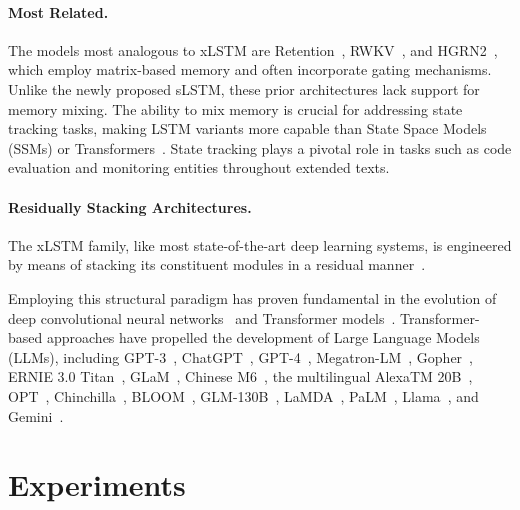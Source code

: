 \paragraph{Most Related.} The models most analogous to xLSTM are Retention~\citep{Sun:23arxiv}, RWKV~\citep{Peng:23arxivshort,Peng:24arxivshort}, and HGRN2~\citep{Qin:24arxiv}, which employ matrix-based memory and often incorporate gating mechanisms. Unlike the newly proposed sLSTM, these prior architectures lack support for memory mixing. The ability to mix memory is crucial for addressing state tracking tasks, making LSTM variants more capable than State Space Models (SSMs) or Transformers~\citep{Merrill:24,Deletang:23}. State tracking plays a pivotal role in tasks such as code evaluation and monitoring entities throughout extended texts.

\paragraph{Residually Stacking Architectures.} The xLSTM family, like most state-of-the-art deep learning systems, is engineered by means of stacking its constituent modules in a residual manner~\citep{Srivastava:15,He:16}.

Employing this structural paradigm has proven fundamental in the evolution of deep convolutional neural networks~\citep{He:16} and Transformer models~\citep{Vaswani:17}. Transformer-based approaches have propelled the development of Large Language Models (LLMs), including GPT-3~\citep{Brown:20short}, ChatGPT~\citep{Schulman:22short}, GPT-4~\citep{Achiam:23gpt4short}, Megatron-LM~\citep{Shoeybi:19}, Gopher~\citep{Rae:21short}, ERNIE 3.0 Titan~\citep{Wang:21arxivshort}, GLaM~\citep{Du:21glamshort}, Chinese M6~\citep{Lin:21}, the multilingual AlexaTM 20B~\citep{Soltan:22}, OPT~\citep{Zhang:22opt}, Chinchilla~\citep{Hoffmann:22short}, BLOOM~\citep{Scao:22arxivshort}, GLM-130B~\citep{Zeng:22arxivshort}, LaMDA~\citep{Thoppilan:22short}, PaLM~\citep{Chowdhery:22short}, Llama~\citep{Touvron:23arxiv}, and Gemini~\citep{GeminiTeam:23arxiv,Reid:24arxiv}.

\section{Experiments}
\label{sec:Exp}

